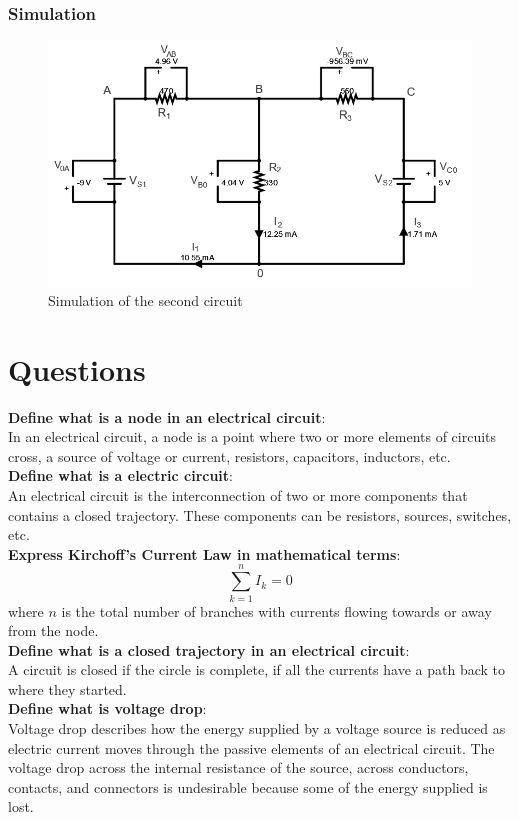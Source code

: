 \documentclass[a4paper]{article}
\begin{document}
\subsubsection{Simulation}
\begin{figure}[H]
    \centering
    \includegraphics[width=.7\textwidth]{circ2}
    \caption{Simulation of the second circuit}
\end{figure}
\section{Questions}
\textbf{Define what is a node in an electrical circuit}:\\[0.5ex]
In an electrical circuit, a node is a point where two or more elements of circuits cross, a source of voltage or current, resistors, capacitors, inductors, etc.\\
\textbf{Define what is a electric circuit}:\\[0.5ex]
An electrical circuit is the interconnection of two or more components that contains a closed trajectory. These components can be resistors, sources, switches, etc.\\
\textbf{Express Kirchoff's Current Law in mathematical terms}:\\[0.5ex]
\[\sum_{k=1}^n I_k=0\]
where $n$ is the total number of branches with currents flowing towards or away from the node.\\
\textbf{Define what is a closed trajectory in an electrical circuit}:\\[0.5ex]
A circuit is closed if the circle is complete, if all the currents have a path back to where they started.\\
\textbf{Define what is voltage drop}:\\[0.5ex]
Voltage drop describes how the energy supplied by a voltage source is reduced as electric current moves through the passive elements of an electrical circuit. The voltage drop across the internal resistance of the source, across conductors, contacts, and connectors is undesirable because some of the energy supplied is lost.\\
\end{document}
